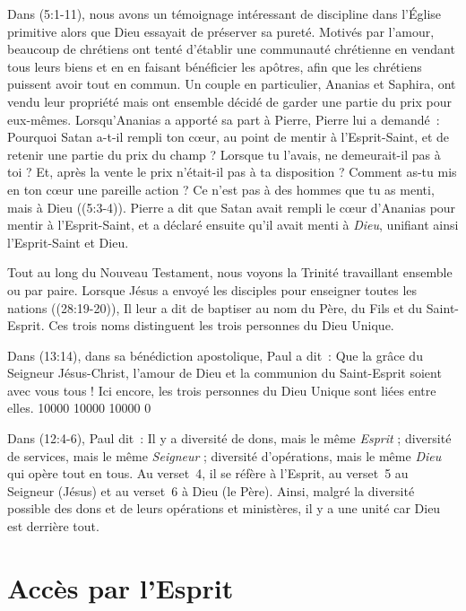 Dans (5:1-11), nous avons un témoignage intéressant de
 discipline dans l'Église primitive alors que Dieu essayait de préserver
 sa pureté.
 Motivés par l'amour, beaucoup de chrétiens ont tenté d'établir une
 communauté chrétienne en vendant tous leurs biens et en en faisant
 bénéficier les apôtres, afin que les chrétiens puissent avoir tout en
 commun. Un couple en particulier, Ananias et Saphira, ont vendu leur
 propriété mais ont ensemble décidé de garder une partie du prix pour
 eux-mêmes. Lorsqu'Ananias a apporté sa part à Pierre, Pierre lui a
 demandé~: \og Pourquoi Satan a-t-il rempli ton cœur, au point de mentir
 à l'Esprit-Saint, et de retenir une partie du prix du champ ? Lorsque tu
 l'avais, ne demeurait-il pas à toi ? Et, après la vente le prix n'était-il
 pas à ta disposition ?
 Comment as-tu mis en ton cœur une pareille action ?
 Ce n'est pas à des hommes que tu as menti, mais à Dieu \fg{}
 ((5:3-4)).  
 Pierre a dit que Satan avait rempli le cœur d'Ananias pour mentir
 à l'Esprit-Saint, et a déclaré ensuite qu'il avait menti à \emph{Dieu}, unifiant
 ainsi l'Esprit-Saint et Dieu.

Tout au long du Nouveau Testament, nous voyons la Trinité travaillant ensemble
 ou par paire. Lorsque Jésus a envoyé les disciples pour enseigner toutes
 les nations ((28:19-20)), Il leur a dit de baptiser au nom
 du Père, du Fils et du Saint-Esprit. Ces trois noms distinguent les trois
 personnes du Dieu Unique.

Dans (13:14), dans sa bénédiction apostolique, Paul a dit~:
 \og Que la grâce du Seigneur Jésus-Christ, l'amour de Dieu et la communion
 du Saint-Esprit soient avec vous tous ! \fg{}
 Ici encore, les trois personnes du Dieu Unique sont liées entre elles.
 \begingroup{} 10000 10000 10000 0
 \par\endgroup

Dans (12:4-6), Paul dit~:
 \og Il y a diversité de dons, mais le même \emph{Esprit} ; diversité de services,
 mais le même \emph{Seigneur} ; diversité d'opérations, mais le
 même \emph{Dieu} qui opère tout en tous. \fg{}
 Au verset~4, il se réfère à l'Esprit,
 au verset~5 au Seigneur (Jésus)
 et au verset~6 à Dieu (le Père).
 Ainsi, malgré la diversité possible des dons et de leurs opérations
 et ministères, il y a une unité car Dieu est derrière tout.


\section{Acc\`es par l'Esprit}

